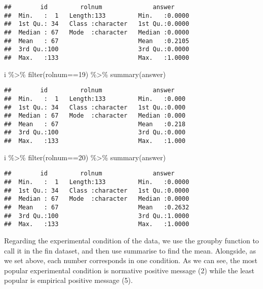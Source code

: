 \documentclass[
]{article}
\newenvironment{Shaded}{\begin{snugshade}}{\end{snugshade}}
\newcommand{\DecValTok}[1]{\textcolor[rgb]{0.00,0.00,0.81}{#1}}
\newcommand{\FunctionTok}[1]{\textcolor[rgb]{0.00,0.00,0.00}{#1}}
\newcommand{\NormalTok}[1]{#1}
\newcommand{\SpecialCharTok}[1]{\textcolor[rgb]{0.00,0.00,0.00}{#1}}
\begin{document}
\begin{enumerate}
\begin{verbatim}
##        id         rolnum              answer      
##  Min.   :  1   Length:133         Min.   :0.0000  
##  1st Qu.: 34   Class :character   1st Qu.:0.0000  
##  Median : 67   Mode  :character   Median :0.0000  
##  Mean   : 67                      Mean   :0.2105  
##  3rd Qu.:100                      3rd Qu.:0.0000  
##  Max.   :133                      Max.   :1.0000
\end{verbatim}

\begin{Shaded}
\begin{Highlighting}[]
\NormalTok{i }\SpecialCharTok{\%\textgreater{}\%} \FunctionTok{filter}\NormalTok{(rolnum}\SpecialCharTok{==}\DecValTok{19}\NormalTok{) }\SpecialCharTok{\%\textgreater{}\%} \FunctionTok{summary}\NormalTok{(answer)}
\end{Highlighting}
\end{Shaded}

\begin{verbatim}
##        id         rolnum              answer     
##  Min.   :  1   Length:133         Min.   :0.000  
##  1st Qu.: 34   Class :character   1st Qu.:0.000  
##  Median : 67   Mode  :character   Median :0.000  
##  Mean   : 67                      Mean   :0.218  
##  3rd Qu.:100                      3rd Qu.:0.000  
##  Max.   :133                      Max.   :1.000
\end{verbatim}

\begin{Shaded}
\begin{Highlighting}[]
\NormalTok{i }\SpecialCharTok{\%\textgreater{}\%} \FunctionTok{filter}\NormalTok{(rolnum}\SpecialCharTok{==}\DecValTok{20}\NormalTok{) }\SpecialCharTok{\%\textgreater{}\%} \FunctionTok{summary}\NormalTok{(answer)}
\end{Highlighting}
\end{Shaded}

\begin{verbatim}
##        id         rolnum              answer      
##  Min.   :  1   Length:133         Min.   :0.0000  
##  1st Qu.: 34   Class :character   1st Qu.:0.0000  
##  Median : 67   Mode  :character   Median :0.0000  
##  Mean   : 67                      Mean   :0.2632  
##  3rd Qu.:100                      3rd Qu.:1.0000  
##  Max.   :133                      Max.   :1.0000
\end{verbatim}

  Regarding the experimental condition of the data, we use the groupby
  function to call it in the fin dataset, and then use summarise to find
  the mean. Alongside, as we set above, each number corresponds in one
  condition. As we can see, the most popular experimental condition is
  normative positive message (2) while the least popular is empirical
  positive message (5).


\end{enumerate}
\end{document}
